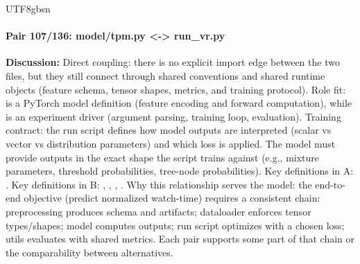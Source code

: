 \documentclass[11pt]{article}
\begin{document}
\begin{CJK*}{UTF8}{gbsn}
\paragraph{Pair 107/136: model/tpm.py <-> run\_vr.py}
\textbf{Discussion:} Direct coupling: there is no explicit import edge between the two files, but they still connect through shared conventions and shared runtime objects (feature schema, tensor shapes, metrics, and training protocol). Role fit: \texttt{} is a PyTorch model definition (feature encoding and forward computation), while \texttt{} is an experiment driver (argument parsing, training loop, evaluation). Training contract: the run script defines how model outputs are interpreted (scalar vs vector vs distribution parameters) and which loss is applied. The model must provide outputs in the exact shape the script trains against (e.g., mixture parameters, threshold probabilities, tree-node probabilities). Key definitions in A: \texttt{}. Key definitions in B: \texttt{}, \texttt{}, \texttt{}, \texttt{}. Why this relationship serves the model: the end-to-end objective (predict normalized watch-time) requires a consistent chain: preprocessing produces schema and artifacts; dataloader enforces tensor types/shapes; model computes outputs; run script optimizes with a chosen loss; utils evaluates with shared metrics. Each pair supports some part of that chain or the comparability between alternatives.


\end{CJK*}
\end{document}
